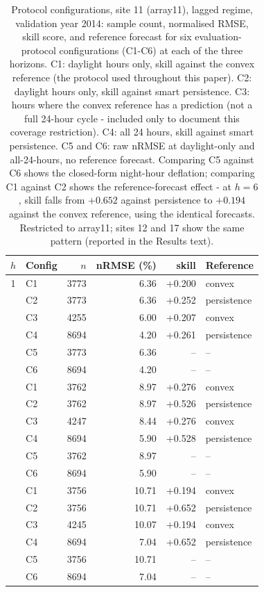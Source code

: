 \begin{table}[t]
  \centering
  \small
  \caption{Protocol configurations, site 11 (array11), lagged regime, validation year 2014: sample count, normalised RMSE, skill score, and reference forecast for six evaluation-protocol configurations (C1-C6) at each of the three horizons. C1: daylight hours only, skill against the convex reference (the protocol used throughout this paper). C2: daylight hours only, skill against smart persistence. C3: hours where the convex reference has a prediction (not a full 24-hour cycle - included only to document this coverage restriction). C4: all 24 hours, skill against smart persistence. C5 and C6: raw nRMSE at daylight-only and all-24-hours, no reference forecast. Comparing C5 against C6 shows the closed-form night-hour deflation; comparing C1 against C2 shows the reference-forecast effect - at $h=6$, skill falls from $+0.652$ against persistence to $+0.194$ against the convex reference, using the identical forecasts. Restricted to array11; sites 12 and 17 show the same pattern (reported in the Results text).}
  \label{tab:T4}
  \begin{tabular}{cl rrrl}
    \toprule
    $h$ & Config & $n$ & nRMSE (\%) & skill & Reference \\
    \midrule
    1 & C1 & 3773 & 6.36 & +0.200 & convex \\
     & C2 & 3773 & 6.36 & +0.252 & persistence \\
     & C3 & 4255 & 6.00 & +0.207 & convex \\
     & C4 & 8694 & 4.20 & +0.261 & persistence \\
     & C5 & 3773 & 6.36 & -- & -- \\
     & C6 & 8694 & 4.20 & -- & -- \\
    \addlinespace
    3 & C1 & 3762 & 8.97 & +0.276 & convex \\
     & C2 & 3762 & 8.97 & +0.526 & persistence \\
     & C3 & 4247 & 8.44 & +0.276 & convex \\
     & C4 & 8694 & 5.90 & +0.528 & persistence \\
     & C5 & 3762 & 8.97 & -- & -- \\
     & C6 & 8694 & 5.90 & -- & -- \\
    \addlinespace
    6 & C1 & 3756 & 10.71 & +0.194 & convex \\
     & C2 & 3756 & 10.71 & +0.652 & persistence \\
     & C3 & 4245 & 10.07 & +0.194 & convex \\
     & C4 & 8694 & 7.04 & +0.652 & persistence \\
     & C5 & 3756 & 10.71 & -- & -- \\
     & C6 & 8694 & 7.04 & -- & -- \\
    \bottomrule
  \end{tabular}
\end{table}
